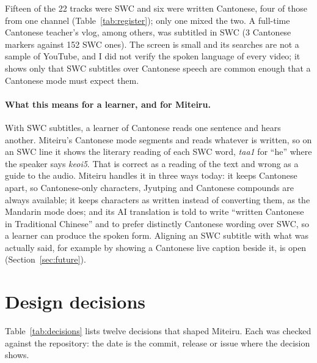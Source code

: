 ﻿\documentclass[11pt,a4paper]{article}
\begin{document}
Fifteen of the 22 tracks were SWC and six were written Cantonese, four of those from one channel (Table~\ref{tab:register}); only one mixed the two. A full-time Cantonese teacher's vlog, among others, was subtitled in SWC (3 Cantonese markers against 152 SWC ones). The screen is small and its searches are not a sample of YouTube, and I did not verify the spoken language of every video; it shows only that SWC subtitles over Cantonese speech are common enough that a Cantonese mode must expect them.

\paragraph{What this means for a learner, and for Miteiru.}
With SWC subtitles, a learner of Cantonese reads one sentence and hears another. Miteiru's Cantonese mode segments and reads whatever is written, so on an SWC line it shows the literary reading of each SWC word, \emph{taa1} for ``he'' where the speaker says \emph{keoi5}. That is correct as a reading of the text and wrong as a guide to the audio. Miteiru handles it in three ways today: it keeps Cantonese apart, so Cantonese-only characters, Jyutping and Cantonese compounds are always available; it keeps characters as written instead of converting them, as the Mandarin mode does; and its AI translation is told to write ``written Cantonese in Traditional Chinese'' and to prefer distinctly Cantonese wording over SWC, so a learner can produce the spoken form. Aligning an SWC subtitle with what was actually said, for example by showing a Cantonese live caption beside it, is open (Section~\ref{sec:future}).

\section{Design decisions}
\label{sec:decisions}

Table~\ref{tab:decisions} lists twelve decisions that shaped Miteiru. Each was checked against the repository: the date is the commit, release or issue where the decision shows.
\end{document}
